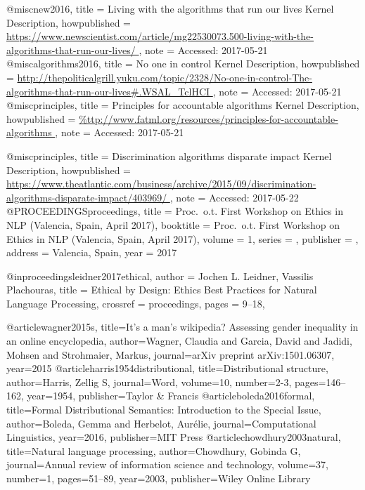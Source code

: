 
@misc{new2016,
  title = {{Living with the algorithms that run our lives} Kernel Description},
  howpublished = {\url{https://www.newscientist.com/article/mg22530073.500-living-with-the-algorithms-that-run-our-lives/
}},
  note = {Accessed: 2017-05-21}
}
@misc{algorithms2016,
  title = {{No one in control} Kernel Description},
  howpublished = {\url{http://thepoliticalgrill.yuku.com/topic/2328/No-one-in-control-The-algorithms-that-run-our-lives#.WSAL_TclHCI
}},
  note = {Accessed: 2017-05-21}
}
@misc{principles,
  title = {{Principles for accountable algorithms} Kernel Description},
  howpublished = {\url{%
}},
  note = {Accessed: 2017-05-21}
}

@misc{principles,
  title = {{Discrimination algorithms disparate impact} Kernel Description},
  howpublished = {\url{https://www.theatlantic.com/business/archive/2015/09/discrimination-algorithms-disparate-impact/403969/
}},
  note = {Accessed: 2017-05-22}
}
@PROCEEDINGS{proceedings,
  title = {Proc.\ o.t. First Workshop on Ethics in NLP
      (Valencia, Spain, April 2017)},
  booktitle = {Proc.\ o.t. First Workshop on Ethics in NLP
      (Valencia, Spain, April 2017)},
  volume = 1,
  series = {},
  publisher = {},
  address = {Valencia, Spain},
  year = {2017}
}

@inproceedings{leidner2017ethical,
  author =       {Jochen L. Leidner, Vassilis Plachouras},
  title =        {Ethical by Design: Ethics Best Practices for Natural Language Processing},
  crossref =     {proceedings},
  pages =        {9--18},
}


@article{wagner2015s,
  title={It's a man's wikipedia? Assessing gender inequality in an online encyclopedia},
  author={Wagner, Claudia and Garcia, David and Jadidi, Mohsen and Strohmaier, Markus},
  journal={arXiv preprint arXiv:1501.06307},
  year={2015}
}
@article{harris1954distributional,
  title={Distributional structure},
  author={Harris, Zellig S},
  journal={Word},
  volume={10},
  number={2-3},
  pages={146--162},
  year={1954},
  publisher={Taylor \& Francis}
}
@article{boleda2016formal,
  title={Formal Distributional Semantics: Introduction to the Special Issue},
  author={Boleda, Gemma and Herbelot, Aur{\'e}lie},
  journal={Computational Linguistics},
  year={2016},
  publisher={MIT Press}
}
@article{chowdhury2003natural,
  title={Natural language processing},
  author={Chowdhury, Gobinda G},
  journal={Annual review of information science and technology},
  volume={37},
  number={1},
  pages={51--89},
  year={2003},
  publisher={Wiley Online Library}
}


